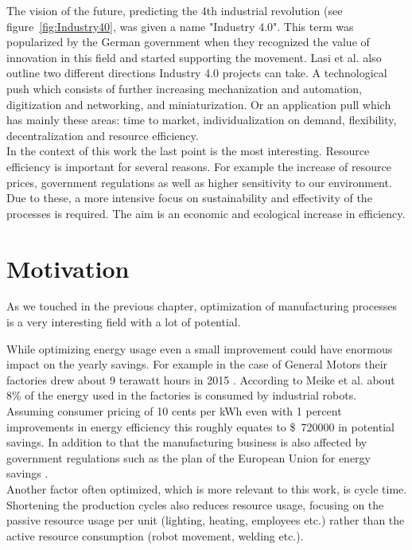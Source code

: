 The vision of the future, predicting the 4th industrial revolution (see figure~\ref{fig:Industry40}, was given a name "Industry 4.0". This term was popularized by the German government when they recognized the value of innovation in this field and started supporting the movement. Lasi et al. \cite{Industry40} also outline two different directions Industry 4.0 projects can take. A technological push which consists of further increasing mechanization and automation, digitization and networking, and miniaturization. Or an application pull which has mainly these areas: time to market, individualization on demand, flexibility, decentralization and resource efficiency. \\

In the context of this work the last point is the most interesting.
Resource efficiency is important for several reasons.
For example the increase of resource prices, government regulations as well as higher sensitivity to our environment. Due to these, a more intensive focus on sustainability and effectivity of the processes is required. 
The aim is an economic and ecological increase in efficiency. 

\section{Motivation}

As we touched in the previous chapter, optimization of manufacturing processes is a very interesting field with a lot of potential.

While optimizing energy usage even a small improvement could have enormous impact on the yearly savings. For example in the case of General Motors their factories drew about 9 terawatt hours in 2015 \cite{GMEnergySpending}. According to Meike et al. \cite{Meike8Percent} about 8\% of the energy used in the factories is consumed by industrial robots. Assuming consumer pricing of 10 cents per kWh even with 1 percent improvements in energy efficiency this roughly equates to \$~720000 in potential savings. In addition to that the manufacturing business is also affected by government regulations such as the plan of the European Union for energy savings \cite{EUElectricity}. \\

Another factor often optimized, which is more relevant to this work, is cycle time. Shortening the production cycles also reduces resource usage, focusing on the passive resource usage per unit (lighting, heating, employees etc.) rather than the active resource consumption (robot movement, welding etc.). \\

